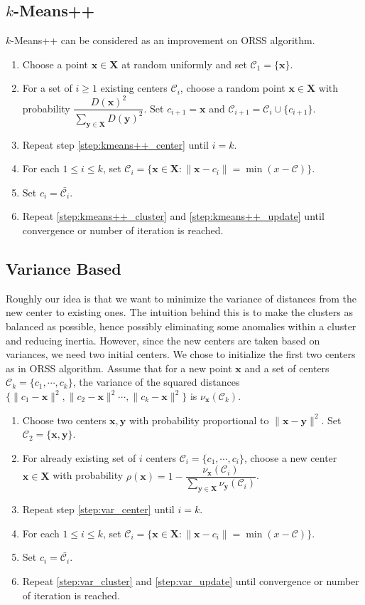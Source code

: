 \documentclass[twoside, 11pt]{article}
\newcommand{\x}{\mathbf{x}}
\newcommand{\X}{\mathbf{X}}
\newcommand{\y}{\mathbf{y}}
\newcommand{\C}{\mathcal{C}}
\begin{document}
	\subsection{$k$-Means++}
	$k$-Means++ \cite{kmeans++} can be considered as an improvement on ORSS algorithm.
		\begin{enumerate}[i]
			\item Choose a point $\x\in\X$ at random uniformly and set $\C_1=\{\x\}$.
			\item For a set of $i\geq1$ existing centers $\C_i$, choose a random point $\x\in\X$ with probability $\dfrac{D(\x)^2}{\sum_{\y\in\X}D(\y)^2}$. Set $c_{i+1}=\x$ and $\C_{i+1}=\C_i\cup\{c_{i+1}\}$.\label{step:kmeans++_center}
			\item Repeat step \eqref{step:kmeans++_center} until $i=k$.
			\item For each $1\leq i\leq k$, set $\C_i=\{\x\in\X:\|\x-c_i\|=\min(x-\C)\}$.\label{step:kmeans++_cluster}
			\item Set $c_i=\bar{\C_i}$.\label{step:kmeans++_update}
			\item Repeat \eqref{step:kmeans++_cluster} and \eqref{step:kmeans++_update} until convergence or number of iteration is reached.\label{step:kmeans++_repeat}
		\end{enumerate}
	\subsection{Variance Based}
	Roughly our idea is that we want to minimize the variance of distances from the new center to existing ones. The intuition behind this is to make the clusters as balanced as possible, hence possibly eliminating some anomalies within a cluster and reducing inertia. However, since the new centers are taken based on variances, we need two initial centers. We chose to initialize the first two centers as in ORSS algorithm. Assume that for a new point $\x$ and a set of centers $\C_k=\{c_1,\cdots,c_k\}$, the variance of the squared distances $\{\| c_1-\x\|^2,\|c_2-\x\|^2\cdots,\| c_k-\x\|^2\}$ is $\nu_\x(\C_k)$.
		\begin{enumerate}[i]
			\item Choose two centers $\x,\y$ with probability proportional to $\|\x-\y\|^2$. Set $\C_2=\{\x,\y\}$.
			\item For already existing set of $i$ centers $\mathcal{C}_i=\{c_1,\cdots,c_i\}$, choose a new center $\x\in\X$ with probability $\rho(\x)=1-\dfrac{\nu_\x(\C_i)}{\sum_{\y\in\X}\nu_\y(\C_i)}$.\label{step:var_center}
			\item Repeat step \eqref{step:var_center} until $i=k$.
			\item For each $1\leq i\leq k$, set $\C_i=\{\x\in\X:\|\x-c_i\|=\min(x-\C)\}$.\label{step:var_cluster}
			\item Set $c_i=\bar{\C_i}$.\label{step:var_update}
			\item Repeat \eqref{step:var_cluster} and \eqref{step:var_update} until convergence or number of iteration is reached.
		\end{enumerate}
\end{document}
